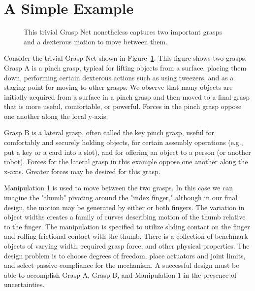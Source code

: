 \section{A Simple Example}


\begin{figure}
\begin{center}
\vspace*{2in}
\end{center}
\caption[]{This trivial Grasp Net nonetheless captures two important grasps and a dexterous motion to move between them.}
\label{SimpleGraspNet}
\end{figure}

Consider the trivial Grasp Net shown in Figure~\ref{SimpleGraspNet}.     This figure shows two grasps.   Grasp A is a pinch grasp, typical for lifting objects from a surface, placing them down, performing certain dexterous actions such as using tweezers, and as a staging point for moving to other grasps.   We observe that many objects are initially acquired from a surface in a pinch grasp and then moved to a final grasp that is more useful, comfortable, or powerful.    Forces in the pinch grasp oppose one another along the local y-axis.   

Grasp B is a lateral grasp, often called the key pinch grasp, useful for comfortably and securely holding objects, for certain assembly operations (e.g., put a key or a card into a slot), and for offering an object to a person (or another robot).   Forces for the lateral grasp in this example oppose one another along the x-axis.  Greater forces may be desired for this grasp.   

Manipulation 1 is used to move between the two grasps.   In this case we can imagine the "thumb" pivoting around the "index finger," although in our final design, the motion may be generated by either or both fingers.    The variation in object widths creates a family of curves describing motion of the thumb relative to the finger.   The manipulation is specified to utilize sliding contact on the finger and rolling frictional contact with the thumb.  There is a collection of benchmark objects of varying width, required grasp force, and other physical properties.   The design problem is to choose degrees of freedom, place actuators and joint limits, and select passive compliance for the mechanism.  A successful design must be able to accomplish Grasp A, Grasp B, and Manipulation 1 in the presence of uncertainties.

